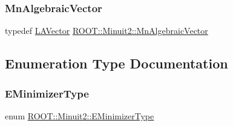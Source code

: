 \mbox{\label{namespaceROOT_1_1Minuit2_a62ed97730a1ca8d3fbaec64a19aa11c9}} 
\subsubsection{\texorpdfstring{MnAlgebraicVector}{MnAlgebraicVector}}
{\footnotesize\ttfamily typedef \mbox{\hyperlink{classROOT_1_1Minuit2_1_1LAVector}{L\+A\+Vector}} \mbox{\hyperlink{namespaceROOT_1_1Minuit2_a62ed97730a1ca8d3fbaec64a19aa11c9}{R\+O\+O\+T\+::\+Minuit2\+::\+Mn\+Algebraic\+Vector}}}



\subsection{Enumeration Type Documentation}
\mbox{\label{namespaceROOT_1_1Minuit2_abdfae3dff24b1dc5a23955c06fe2a8d6}} 
\subsubsection{\texorpdfstring{EMinimizerType}{EMinimizerType}\hspace{0.1cm}{\footnotesize\ttfamily [1/2]}}
{\footnotesize\ttfamily enum \mbox{\hyperlink{namespaceROOT_1_1Minuit2_abdfae3dff24b1dc5a23955c06fe2a8d6}{R\+O\+O\+T\+::\+Minuit2\+::\+E\+Minimizer\+Type}}}


